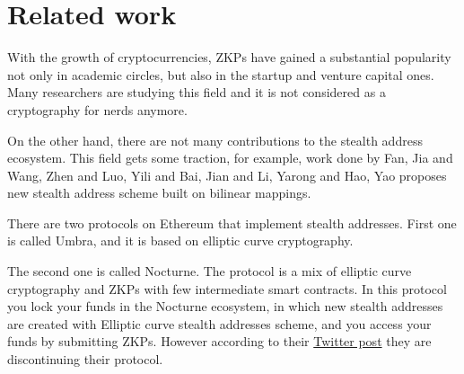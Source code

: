 \chapter{Related work}\label{chapter:related}

With the growth of cryptocurrencies, ZKPs have gained a substantial popularity
not only in academic circles, but also in the startup and venture capital
ones. Many researchers are studying this field and it is not considered 
as a cryptography for nerds anymore. 

On the other hand, there are not many contributions to the stealth address
ecosystem. This field gets some traction, for example, work done by
Fan, Jia and Wang, Zhen and Luo, Yili and Bai, Jian and Li, Yarong and Hao, Yao
\cite{FanJiaWang2019}
proposes new stealth address scheme built on bilinear mappings.

There are two protocols on Ethereum that implement stealth addresses.
First one is called Umbra\cite{umbra}, and it is based on elliptic curve
cryptography.

The second one is called Nocturne\cite{nocturne}. The protocol is a mix of
elliptic curve cryptography and ZKPs with few intermediate smart contracts.
In this protocol you lock your funds in the Nocturne ecosystem, in which
new stealth addresses are created with Elliptic curve stealth addresses scheme,
and you access your funds by submitting ZKPs. However according to their
\href{https://twitter.com/nocturne_xyz/status/1749510390906511693}{Twitter post}
they are discontinuing their protocol.
